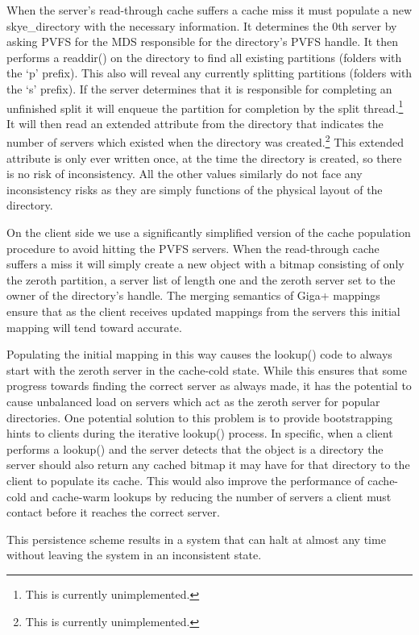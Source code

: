 \documentclass[letterpaper]{article}
\begin{document}
When the server's read-through cache suffers a cache miss it must populate a new
skye\_\-directory with the necessary information.  It determines the 0th server by
asking PVFS for the MDS responsible for the directory's PVFS handle.  It then
performs a readdir() on the directory to find all existing partitions (folders
with the `p' prefix).  This also will reveal any currently splitting partitions
(folders with the `s' prefix).  If the server determines that it is
responsible for completing an unfinished split it will enqueue the partition
for completion by the split thread.\footnote{This is currently unimplemented.}
It will then read an extended attribute from the directory that indicates the
number of servers which existed when the directory was created.\footnote{This
is currently unimplemented.}  This extended attribute is only ever written
once, at the time the directory is created, so there is no risk of
inconsistency.  All the other values similarly do not face any inconsistency
risks as they are simply functions of the physical layout of the directory.

On the client side we use a significantly simplified version of the cache
population procedure to avoid hitting the PVFS servers.  When the read-through
cache suffers a miss it will simply create a new object with a bitmap consisting
of only the zeroth partition, a server list of length one and the zeroth server
set to the owner of the directory's handle.  The merging semantics of Giga+
mappings ensure that as the client receives updated mappings from the servers
this initial mapping will tend toward accurate.

Populating the initial mapping in this way causes the lookup() code to always
start with the zeroth server in the cache-cold state.  While this ensures that
some progress towards finding the correct server as always made, it has the
potential to cause unbalanced load on servers which act as the zeroth server for
popular directories.  One potential solution to this problem is to provide
bootstrapping hints to clients during the iterative lookup() process. In
specific, when a client performs a lookup() and the server detects that the
object is a directory the server should also return any cached bitmap it may
have for that directory to the client to populate its cache.  This would also
improve the performance of cache-cold and cache-warm lookups by reducing the
number of servers a client must contact before it reaches the correct server. 

This persistence scheme results in a system that can halt at almost any time
without leaving the system in an inconsistent state.
\end{document}
